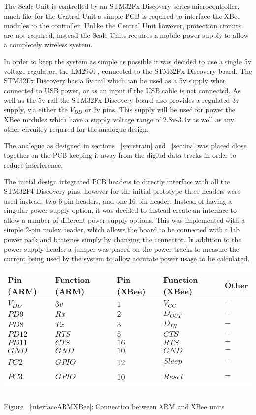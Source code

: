 The Scale Unit is controlled by an STM32Fx Discovery series microcontroller, much like for the Central Unit a simple PCB is required to interface the XBee modules to the controller.  Unlike the Central Unit however, protection circuits are not required, instead the Scale Units requires a mobile power supply to allow a completely wireless system.

In order to keep the system as simple as possible it was decided to use a single 5v voltage regulator, the LM2940 \cite{LM2940}, connected to the STM32Fx Discovery board. The STM32Fx Discovery has a 5v rail which can be used as a 5v supply when connected to USB power, or as an input if the USB cable is not connected. As well as the 5v rail the STM32Fx Discovery board also provides a regulated 3v supply, via either the $V_{DD}$ or 3v pins. This supply will be used for power the XBee modules which have a supply voltage range of 2.8v-3.4v as well as any other circuitry required for the analogue design.

The analogue as designed in sections ~\ref{sec:strain} and ~\ref{sec:ina} was placed close together on the PCB keeping it away from the digital data tracks in order to reduce interference.

The initial design integrated PCB headers to directly interface with all the STM32F4 Discovery pins, however for the initial prototype three headers were used instead; two 6-pin headers, and one 16-pin header. Instead of having a singular power supply option, it was decided to instead create an interface to allow a number of different power supply options. This was implemented with a simple 2-pin molex header, which allows the board to be connected with a lab power pack and batteries simply by changing the connector. In addition to the power supply header a jumper was placed on the power tracks to measure the current being used by the system to allow accurate power usage to be calculated.

\begin{center}
  \begin{tabular}{| l | l | l | l | l |}
    \hline
    \bf{Pin (ARM)} & \bf{Function (ARM)} & \bf{Pin (XBee)} & \bf{Function (XBee)}  & \bf{Other}\\ \hline
         $V_{DD}$ & $3v $& $1 $& $V_{CC} $& $ - $\\ \hline
	 $PD9$ & \(Rx\) &$ 2$ &$ D_{OUT}$ &$ - $\\ \hline
	 $PD8 $& \(Tx\) &$ 3$ &$ D_{IN}$ & $- $\\ \hline
	 $PD12$ & \(RTS\) & $5$ & $CTS$ &$ - $ \\ \hline
	 $PD11$ & $CTS$ & $16$ & $RTS$ & $-$ \\ \hline
	 $GND$ & \(GND\) & $10$ & \(GND\) & $-$\\ \hline
	$PC2 $ & \(GPIO\) & 12 & \(Sleep\) & $-$\\ \hline
	$PC3 $ & \(GPIO\) & 10 & \(Reset\) & $-$ \\
    \hline
  \end{tabular}
\label{interfaceARMXBee}\\
Figure ~\ref{interfaceARMXBee}: Connection between ARM and XBee units
\end{center}
